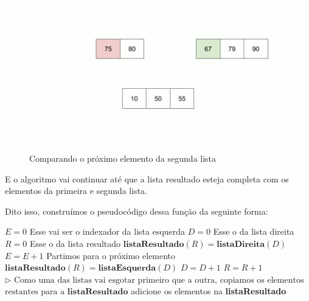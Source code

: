 \begin{figure}[!ht]
	\centering
	\includegraphics[scale=0.3]{figures/merge/merge-function-11.png}
	\caption{Comparando o próximo elemento da segunda lista}
\end{figure}

\FloatBarrier

E o algoritmo vai continuar até que a lista resultado esteja completa com os elementos da primeira e segunda lista.

Dito isso, construímos o pseudocódigo dessa função da seguinte forma:

\begin{algorithm}
	\label{algo:merge_aux_pseudo}
	\begin{algorithmic}[1]
		\Statex
		\State $E = 0$ \Comment Esse vai ser o indexador da lista esquerda
		\State $D = 0$ \Comment Esse o da lista direita
		\State $R = 0$ \Comment Esse o da lista resultado
		\State $\mathbf{listaResultado}(R) = \mathbf{listaDireita}(D)$
		\State $E = E + 1$ \Comment Partimos para o próximo elemento
		\Else
		\State $\mathbf{listaResultado}(R) = \mathbf{listaEsquerda}(D)$
		\State $D = D + 1$
		\EndIf
		\State $R = R + 1$
		\EndWhile
		\State $\rhd \text{ Como uma das listas vai esgotar primeiro que a outra, copiamos os elementos}$
		\State $\text{restantes para a }\mathbf{listaResultado}$
		\State adicione os elementos na \textbf{listaResultado}
		\EndWhile
		\EndFunction
	\end{algorithmic}
\end{algorithm}

